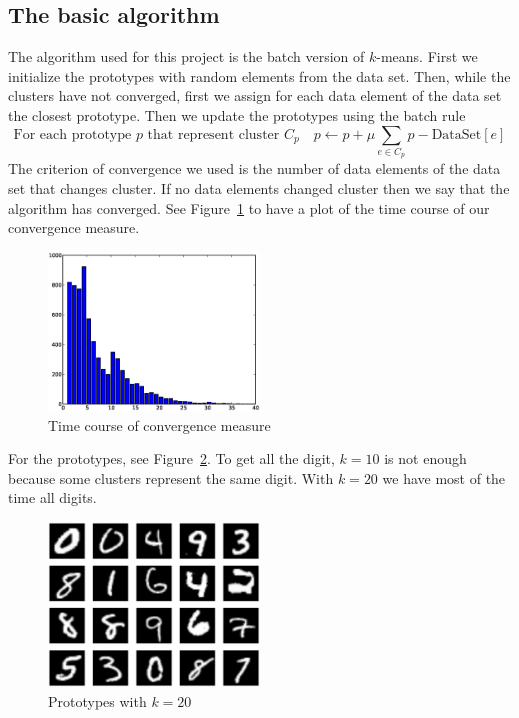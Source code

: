 \documentclass[12pt,a4paper]{article}
\begin{document}
\subsection*{The basic algorithm}
The algorithm used for this project is the batch version of $k$-means.
First we initialize the prototypes with random elements from the data set. Then, while the clusters have not converged, first we assign for each data element of the data set
the closest prototype. Then we update the prototypes using the batch rule
\[
\mbox{For each prototype $p$ that represent cluster $C_p$} \quad p \leftarrow p + \mu \sum_{e \in C_p}{p - \mathrm{DataSet}[e]}
\]
The criterion of convergence we used is the number of data elements of the data set that changes cluster. If no data elements changed cluster then we say that the algorithm has converged.
See Figure~\ref{fig:convergence} to have a plot of the time course of our convergence measure.
\begin{figure}
    \centering
    \includegraphics[width=0.5\textwidth]{convergence}
    \caption{Time course of convergence measure}
    \label{fig:convergence}
\end{figure}

For the prototypes, see Figure~\ref{fig:proto1.1}. To get all the digit, $k = 10$ is not enough because some clusters represent the same digit. With $k=20$ we have most of the time
all digits.
\begin{figure}
    \centering
    \includegraphics[width=0.5\textwidth]{proto1}
    \caption{Prototypes with $k=20$}
    \label{fig:proto1.1}
\end{figure}
\end{document}
